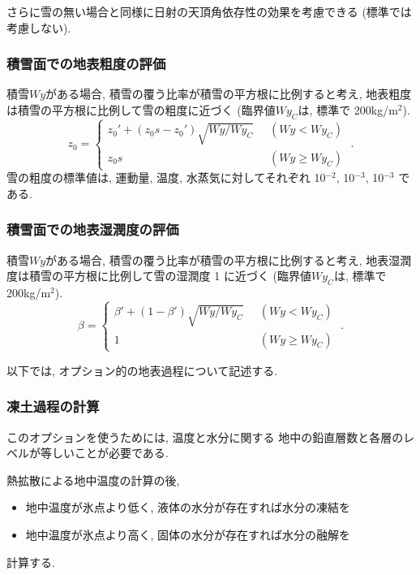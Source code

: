 さらに雪の無い場合と同様に日射の天頂角依存性の効果を考慮できる
(標準では考慮しない). 

\subsubsection{積雪面での地表粗度の評価}

積雪$Wy$がある場合, 
積雪の覆う比率が積雪の平方根に比例すると考え,
地表粗度は積雪の平方根に比例して雪の粗度に近づく
(臨界値$Wy_C$は, 標準で 200kg/m$^2$).
%
\begin{equation}
  z_0 = \left\{ 
  \begin{array}{ll}
    z_0' + (z_0s-z_0')\sqrt{Wy/Wy_{C}}  \;\; &  (Wy < Wy_{C}) \\
    z_0s                                     &  (Wy \ge Wy_{C})
  \end{array}
  \right. \; .
\end{equation}
%
雪の粗度の標準値は, 運動量, 温度, 水蒸気に対してそれぞれ
10$^{-2}$, 10$^{-3}$, 10$^{-3}$ である. 

\subsubsection{積雪面での地表湿潤度の評価}

積雪$Wy$がある場合, 
積雪の覆う比率が積雪の平方根に比例すると考え,
地表湿潤度は積雪の平方根に比例して雪の湿潤度 1 に近づく
(臨界値$Wy_C$は, 標準で 200kg/m$^2$).
%
\begin{equation}
  \beta = \left\{ 
  \begin{array}{ll}
    \beta' + (1-\beta')\sqrt{Wy/Wy_{C}}  \;\; &  (Wy < Wy_{C}) \\
    1                                         &  (Wy \ge Wy_{C})
  \end{array}
  \right. \; .
\end{equation}

\bigskip
以下では, オプション的の地表過程について記述する.
\bigskip

\subsubsection{凍土過程の計算}

このオプションを使うためには, 温度と水分に関する
地中の鉛直層数と各層のレベルが等しいことが必要である. 

熱拡散による地中温度の計算の後, 
\begin{itemize}
  \item 地中温度が氷点より低く, 液体の水分が存在すれば水分の凍結を
  \item 地中温度が氷点より高く, 固体の水分が存在すれば水分の融解を
\end{itemize}
計算する. 

